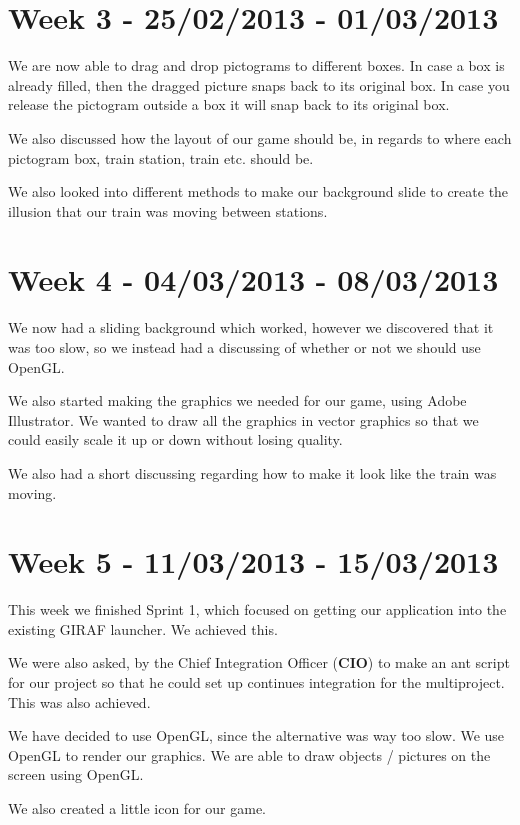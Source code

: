 \section*{Week 3 - 25/02/2013 - 01/03/2013}

We are now able to drag and drop pictograms to different boxes. In case a box is already filled, then the dragged picture snaps back to its original box. In case you release the pictogram outside a box it will snap back to its original box. 

We also discussed how the layout of our game should be, in regards to where each pictogram box, train station, train etc. should be. 

We also looked into different methods to make our background slide to create the illusion that our train was moving between stations. 

\section*{Week 4 - 04/03/2013 - 08/03/2013}
We now had a sliding background which worked, however we discovered that it was too slow, so we instead had a discussing of whether or not we should use OpenGL. 

We also started making the graphics we needed for our game, using Adobe Illustrator. We wanted to draw all the graphics in vector graphics so that we could easily scale it up or down without losing quality. 

We also had a short discussing regarding how to make it look like the train was moving. 

\section*{Week 5 - 11/03/2013 - 15/03/2013}
This week we finished Sprint 1, which focused on getting our application into the existing GIRAF launcher. We achieved this. 

We were also asked, by the Chief Integration Officer (\textbf{CIO}) to make an ant script for our project so that he could set up continues integration for the multiproject. This was also achieved. 

We have decided to use OpenGL, since the alternative was way too slow. We use OpenGL to render our graphics. We are able to draw objects / pictures on the screen using OpenGL. 

We also created a little icon for our game. 

